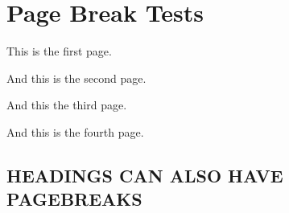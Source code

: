 \section{ Page Break Tests }\label{page-break-tests}

This is the first page.

\clearpage{}

And this is the second page.

\clearpage{}

And this the third page.

\clearpage{}

\clearpage{}

And this is the fourth page.

\clearpage{}

\subsection{\texorpdfstring{\protect\hypertarget{h.io8kap65ol11}{}{}
HEADINGS CAN ALSO HAVE PAGEBREAKS
}{ HEADINGS CAN ALSO HAVE PAGEBREAKS }}\label{headings-can-also-have-pagebreaks}
